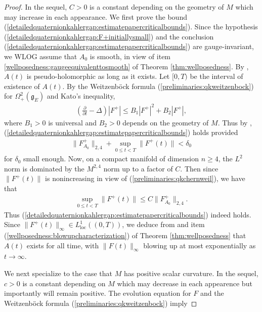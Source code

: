 \documentclass[12pt]{amsart}
\renewcommand{\1}{{\mathbf 1}}
\theoremstyle{others}
\numberwithin{equation}{section}
\begin{document}
  \begin{proof}%
  In the sequel, \(C > 0\) is a constant depending on the geometry of \(M\) which may increase in each appearance. We first prove the bound (\ref{detailedquaternionkahlergap:estimatepapercriticalbounds}). Since the hypothesis (\ref{detailedquaternionkahlergap:F+initiallysmall}) and the conclusion (\ref{detailedquaternionkahlergap:estimatepapercriticalbounds}) are gauge-invariant, we WLOG assume that \(A_0\) is smooth, in view of item \ref{wellposedness:gaugeequivalenttosmooth} of Theorem \ref{thm:wellposedness}. By \cite[Prop. 4.1]{oliveirawaldron}, \(A(t)\) is pseudo-holomorphic as long as it exists. Let \([0, T)\) be the interval of existence of \(A(t)\). By the Weitzenb{\"o}ck formula (\ref{preliminaries:qkweitzenbock}) for \(\Omega_+^2(\mathfrak{g}_E)\) and Kato's inequality,
  \begin{align*}
      \left(\frac{\partial}{\partial t} - \Delta \right) |F^+| \leq B_1|F^+|^2 + B_2|F^+|,
  \end{align*} where \(B_1 > 0\) is universal and \(B_2 > 0\) depends on the geometry of \(M\). Thus by \cite[Theorem 1.2]{estimatespaper}, (\ref{detailedquaternionkahlergap:estimatepapercriticalbounds}) holds provided
  \begin{align*}
      \|F_{A_0}^+\|_{2, 4} + \sup_{0 \leq t < T} \|F^+(t)\| < \delta_0
  \end{align*} for \(\delta_0\) small enough. Now, on a compact manifold of dimension \(n \geq 4\), the \(L^2\) norm is dominated by the \(M^{2, 4}\) norm up to a factor of \(C\). Then since \(\|F^+(t)\|\) is nonincreasing in view of (\ref{preliminaries:qkchernweil}), we have that
    \begin{align*}
        \sup_{0 \leq t < T} \|F^+(t)\| \leq C\|F_{A_0}^+\|_{2, 4}.
    \end{align*} Thus (\ref{detailedquaternionkahlergap:estimatepapercriticalbounds}) indeed holds. Since \(\|F^+(t)\|_\infty \in L_{\text{loc}}^1((0, T))\), we deduce from \cite[Cor. 7.3]{oliveirawaldron} and item (\ref{wellposedness:blowupcharacterization}) of Theorem \ref{thm:wellposedness} that \(A(t)\) exists for all time, with \(\|F(t)\|_\infty\) blowing up at most exponentially as \(t \to \infty\). \par 
    We next specialize to the case that \(M\) has positive scalar curvature. 
    In the sequel, \(c > 0\) is a constant depending on \(M\) which may decrease in each appearence but importantly will remain positive. The evolution equation for \(F\) and the Weitzenb{\"o}ck formula (\ref{preliminaries:qkweitzenbock}) imply

\end{proof}
\end{document}
